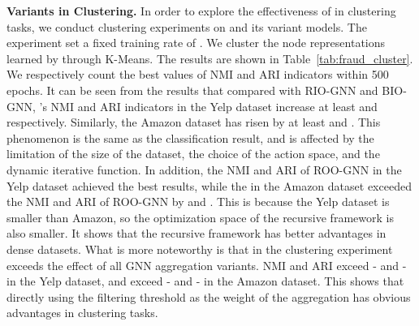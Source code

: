 \begin{table}[t]
    \setlength{\abovecaptionskip}{0.cm}
    \setlength{\belowcaptionskip}{-0.cm}
    \caption{Fraud detection clustering results () compared to \RioGNN variants.}\label{tab:fraud_cluster}
    \centering
\end{table}



\textbf{\RioGNN Variants in Clustering. }
In order to explore the effectiveness of \RioGNN in clustering tasks, we conduct clustering experiments on \RioGNN and its variant models. 
The experiment set a fixed training rate of . 
We cluster the node representations learned by \RioGNN through K-Means. 
The results are shown in Table~\ref{tab:fraud_cluster}. 
We respectively count the best values of NMI and ARI indicators within 500 epochs. 
It can be seen from the results that compared with RIO-GNN and BIO-GNN, \RioGNN's NMI and ARI indicators in the Yelp dataset increase at least  and  respectively. 
Similarly, the Amazon dataset has risen by at least  and . 
This phenomenon is the same as the classification result, and is affected by the limitation of the size of the dataset, the choice of the action space, and the dynamic iterative function. 
In addition, the NMI and ARI of ROO-GNN in the Yelp dataset achieved the best results, while the \RioGNN in the Amazon dataset exceeded the NMI and ARI of ROO-GNN by  and . 
This is because the Yelp dataset is smaller than Amazon, so the optimization space of the recursive framework is also smaller. 
It shows that the recursive framework has better advantages in dense datasets. 
What is more noteworthy is that \RioGNN in the clustering experiment exceeds the effect of all GNN aggregation variants. 
NMI and ARI exceed - and - in the Yelp dataset, and exceed - and - in the Amazon dataset. 
This shows that directly using the filtering threshold as the weight of the aggregation has obvious advantages in clustering tasks.


